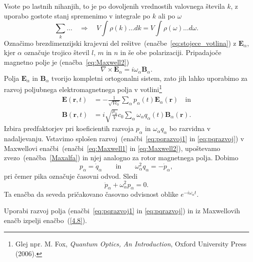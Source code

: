 Vsote po lastnih nihanjih, to je po dovoljenih vrednostih valovnega števila $k$,
z uporabo gostote stanj spremenimo v integrale po $k$ ali po $\omega$
\begin{equation}
\sum_{k}\ldots \quad \Rightarrow \quad V\int\rho(k)\ldots dk=V\int\rho(\omega)\ldots d\omega.
\label{4.5}
\end{equation}
Označimo brezdimenzijski krajevni del rešitve~(enačbe~\ref{eq:stojece_votlina}) z 
$\mathbf{E}_{\alpha}$, kjer $\alpha$
označuje trojico števil $l$, $m$ in $n$ in še obe polarizaciji. 
Pripadajoče magnetno polje je (enačba~\ref{eq:Maxwell2}) 
\begin{equation}
\nabla\times\mathbf{E}_{\alpha}=i\omega_\alpha\mathbf{B}_{\alpha}.
\label{Maxalfa}
\end{equation}
Polja $\mathbf{E}_{\alpha}$ in $\mathbf{B}_{\alpha}$ tvorijo kompletni ortogonalni
sistem, zato jih lahko uporabimo za razvoj poljubnega elektromagnetnega polja v 
votlini\footnote{Glej npr. M. Fox, {\it Quantum Optics, 
An Introduction}, Oxford University Press (2006).}
\begin{align}
\mathbf{E}(\mathbf{r},t) & =  -\frac{1}{\sqrt{V\epsilon_{0}}}
\sum_{\alpha}p_{\alpha}(t)\mathbf{E}_{\alpha}(\mathbf{r}) \quad \mathrm{in} \label{eq:pqrazvoj1}\\
\mathbf{B}(\mathbf{r},t) & =  i\sqrt{\frac{\mu_{0}}{V}}c_0\sum_{\alpha}
\omega_{\alpha}q_{\alpha}(t)\mathbf{B}_{\alpha}(\mathbf{r}).
\label{eq:pqrazvoj}
\end{align}
Izbira predfaktorjev pri koeficientih razvoja $p_\alpha$ in $\omega_\alpha q_\alpha$ bo razvidna
v nadaljevanju. Vstavimo splošen razvoj~(enačbi~\ref{eq:pqrazvoj1} in \ref{eq:pqrazvoj}) v 
Maxwellovi enačbi~(enačbi~\ref{eq:Maxwell1} in \ref{eq:Maxwell2}), 
upoštevamo zvezo~(enačba~\ref{Maxalfa}) in njej analogno za rotor magnetnega polja. Dobimo
\begin{equation}
p_{\alpha}=\dot{q}_{\alpha} \qquad \mathrm{in} \qquad 
\omega_{\alpha}^{2}q_{\alpha}=-\dot{p}_{\alpha},
\label{4.7}
\end{equation}
pri čemer pika označuje časovni odvod. Sledi 
\begin{equation}
\ddot{p}_{\alpha}+\omega_{\alpha}^{2}p_{\alpha}=0.
\label{4.8}
\end{equation}
Ta enačba da seveda pričakovano časovno odvisnost oblike $e^{-i \omega_\alpha t}$.

\begin{naloga}
 Uporabi razvoj polja (enačbi~\ref{eq:pqrazvoj1} in \ref{eq:pqrazvoj}) 
 in iz Maxwellovih enačb izpelji
 enačbo~(\ref{4.8}).
\end{naloga}

